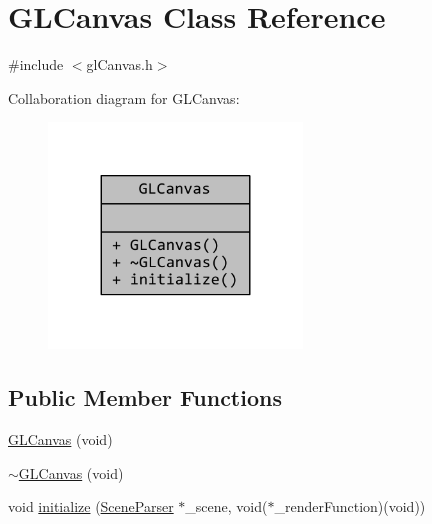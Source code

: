 \hypertarget{classGLCanvas}{\section{G\+L\+Canvas Class Reference}
\label{classGLCanvas}
}


{\ttfamily \#include $<$gl\+Canvas.\+h$>$}



Collaboration diagram for G\+L\+Canvas\+:
\nopagebreak
\begin{figure}[H]
\begin{center}
\leavevmode
\includegraphics[width=191pt]{classGLCanvas__coll__graph}
\end{center}
\end{figure}
\subsection*{Public Member Functions}
\begin{DoxyCompactItemize}
\item 
\hyperlink{classGLCanvas_a6161aee35afa8531506f8357247fc782}{G\+L\+Canvas} (void)
\item 
\hyperlink{classGLCanvas_aa6b2b006cae99358fcd42df419d7a78c}{$\sim$\+G\+L\+Canvas} (void)
\item 
void \hyperlink{classGLCanvas_a293fa06611093bd39192bf8e6cec2b87}{initialize} (\hyperlink{classSceneParser}{Scene\+Parser} $\ast$\+\_\+scene, void($\ast$\+\_\+render\+Function)(void))
\end{DoxyCompactItemize}



